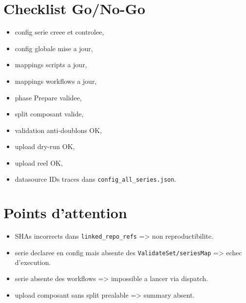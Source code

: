 \documentclass[11pt,a4paper]{article}
\begin{document}
\section{Checklist Go/No-Go}
\begin{itemize}[leftmargin=*]
  \item config serie creee et controlee,
  \item config globale mise a jour,
  \item mappings scripts a jour,
  \item mappings workflows a jour,
  \item phase Prepare validee,
  \item split composant valide,
  \item validation anti-doublons OK,
  \item upload dry-run OK,
  \item upload reel OK,
  \item datasource IDs traces dans \texttt{config\_all\_series.json}.
\end{itemize}

\section{Points d'attention}
\begin{itemize}[leftmargin=*]
  \item SHAs incorrects dans \texttt{linked\_repo\_refs} => non reproductibilite.
  \item serie declaree en config mais absente des \texttt{ValidateSet/seriesMap} => echec d'execution.
  \item serie absente des workflows => impossible a lancer via dispatch.
  \item upload composant sans split prealable => summary absent.
\end{itemize}
\end{document}
